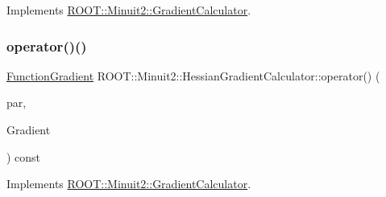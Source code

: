Implements \mbox{\hyperlink{classROOT_1_1Minuit2_1_1GradientCalculator_a1bae913e96ffc9ece28664a5f6f79cb0}{R\+O\+O\+T\+::\+Minuit2\+::\+Gradient\+Calculator}}.

\mbox{\label{classROOT_1_1Minuit2_1_1HessianGradientCalculator_ae8832c265494484c65aed77f023b843f}} 
\subsubsection{\texorpdfstring{operator()()}{operator()()}\hspace{0.1cm}{\footnotesize\ttfamily [3/4]}}
{\footnotesize\ttfamily \mbox{\hyperlink{classROOT_1_1Minuit2_1_1FunctionGradient}{Function\+Gradient}} R\+O\+O\+T\+::\+Minuit2\+::\+Hessian\+Gradient\+Calculator\+::operator() (\begin{DoxyParamCaption}\item[{const \mbox{\hyperlink{classROOT_1_1Minuit2_1_1MinimumParameters}{Minimum\+Parameters}} \&}]{par,  }\item[{const \mbox{\hyperlink{classROOT_1_1Minuit2_1_1FunctionGradient}{Function\+Gradient}} \&}]{Gradient }\end{DoxyParamCaption}) const\hspace{0.3cm}{\ttfamily [virtual]}}



Implements \mbox{\hyperlink{classROOT_1_1Minuit2_1_1GradientCalculator_a1809c1e8a89d32aabf7835e9690c2916}{R\+O\+O\+T\+::\+Minuit2\+::\+Gradient\+Calculator}}.

